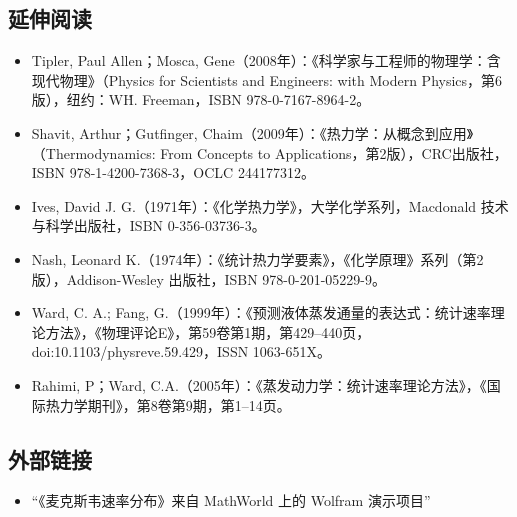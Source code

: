 \subsection{延伸阅读}
\begin{itemize}
\item Tipler, Paul Allen；Mosca, Gene（2008年）：《科学家与工程师的物理学：含现代物理》（Physics for Scientists and Engineers: with Modern Physics，第6版），纽约：W\.H. Freeman，ISBN 978-0-7167-8964-2。
\item Shavit, Arthur；Gutfinger, Chaim（2009年）：《热力学：从概念到应用》（Thermodynamics: From Concepts to Applications，第2版），CRC出版社，ISBN 978-1-4200-7368-3，OCLC 244177312。
\item Ives, David J. G.（1971年）：《化学热力学》，大学化学系列，Macdonald 技术与科学出版社，ISBN 0-356-03736-3。
\item Nash, Leonard K.（1974年）：《统计热力学要素》，《化学原理》系列（第2版），Addison-Wesley 出版社，ISBN 978-0-201-05229-9。
\item Ward, C. A.; Fang, G.（1999年）：《预测液体蒸发通量的表达式：统计速率理论方法》，《物理评论E》，第59卷第1期，第429–440页，doi:10.1103/physreve.59.429，ISSN 1063-651X。
\item Rahimi, P；Ward, C.A.（2005年）：《蒸发动力学：统计速率理论方法》，《国际热力学期刊》，第8卷第9期，第1–14页。
\end{itemize}
\subsection{外部链接}
\begin{itemize}
\item “《麦克斯韦速率分布》来自 MathWorld 上的 Wolfram 演示项目”
\end{itemize}
